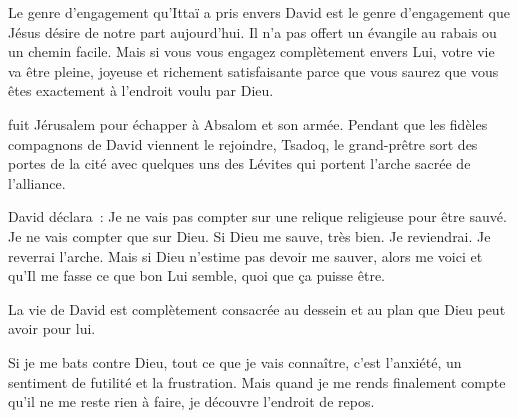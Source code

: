 Le genre d'engagement qu'Ittaï a pris envers David est le genre d'engagement
 que Jésus désire de notre part aujourd'hui.
 Il n'a pas offert un évangile au rabais ou un chemin facile.
 Mais si vous vous engagez complètement envers Lui, votre vie va être pleine,
 joyeuse et richement satisfaisante \ocadr parce que vous saurez
 que vous êtes exactement à l'endroit voulu par Dieu. 

\dvrule






 fuit Jérusalem pour échapper à Absalom et son armée.
 Pendant que les fidèles compagnons de David viennent le rejoindre,
 Tsadoq, le grand-prêtre sort des portes de la cité avec quelques uns
 des Lévites qui portent l'arche sacrée de l'alliance. 

David déclara~:
 \og Je ne vais pas compter sur une relique religieuse pour être sauvé.
 Je ne vais compter que sur Dieu. Si Dieu me sauve, très bien. Je reviendrai.
 Je reverrai l'arche. Mais si Dieu n'estime pas devoir me sauver,
 alors me voici et qu'Il me fasse ce que bon Lui semble,
 quoi que ça puisse être. \fg{}

La vie de David est complètement consacrée au dessein
 et au plan que Dieu peut avoir pour lui. 


Si je me bats contre Dieu, tout ce que je vais connaître, c'est l'anxiété,
 un sentiment de futilité et la frustration.
 Mais quand je me rends finalement compte qu'il ne me reste rien à faire,
 je découvre l'endroit de repos. 

